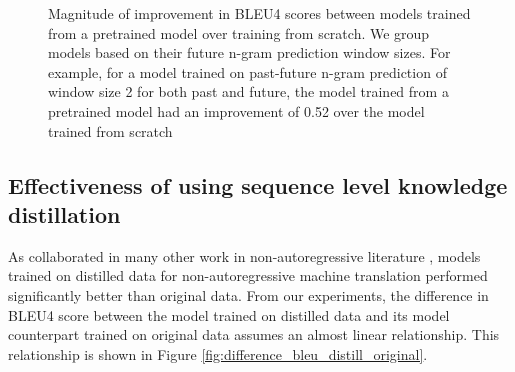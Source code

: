 \begin{figure}
\centering
{}
\caption{Magnitude of improvement in BLEU4 scores between models trained from a pretrained model over training from scratch. We group models based on their future n-gram prediction window sizes. For example, for a model trained on past-future n-gram prediction of window size 2 for both past and future, the model trained from a pretrained model had an improvement of 0.52 over the model trained from scratch}
\label{fig:difference_bleu_pretrained_from_scratch}
\end{figure}

\subsection{Effectiveness of using sequence level knowledge distillation}
As collaborated in many other work in non-autoregressive literature \cite{ren_study_2020_comma, gu_non-autoregressive_2018, gu_levenshtein_2019, guo_non-autoregressive_2020_image_captioning, bao_non-autoregressive_2019_position_learning, wang_semi-autoregressive_2018,saharia_non-autoregressive_2020_latent_alignment, chan_kermit_2019, chan_multilingual_kermit, ghazvininejad_mask-predict_2019,stern_insertion_2019, zhou_improving_2020_with_monolingual_data, ran_guiding_2020_reordering, ma_flowseq_2019, qian_glancing_2020, guo_fine-tuning_2019_curriculum, ding_context-aware_2020}, models trained on distilled data for non-autoregressive machine translation performed significantly better than original data. From our experiments, the difference in BLEU4 score between the model trained on distilled data and its model counterpart trained on original data assumes an almost linear relationship. This relationship is shown in Figure \ref{fig:difference_bleu_distill_original}. 

